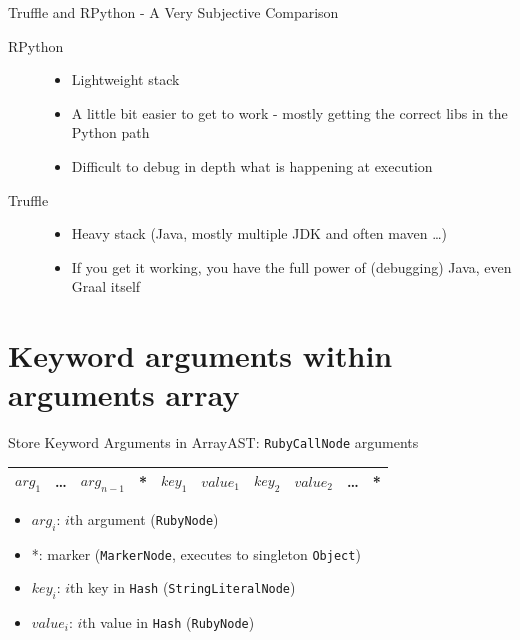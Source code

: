 \documentclass[xcolor=dvipsname,handout]{beamer} %
\begin{document}
\begin{frame}{Truffle and RPython - A Very Subjective Comparison}
\begin{description}
 \item[RPython] \begin{itemize}
  \item Lightweight stack
  \item A little bit easier to get to work - mostly getting the correct libs in the Python path
  \item Difficult to debug in depth what is happening at execution
\end{itemize}
\item[Truffle] \begin{itemize}
  \item Heavy stack (Java, mostly multiple JDK and often maven \dots)
  \item If you get it working, you have the full power of (debugging) Java, even Graal itself
\end{itemize}
\end{description}
\end{frame}


\appendix
\section{Keyword arguments within arguments array}

\begin{frame}{Store Keyword Arguments in Array}{AST: \lstinline{RubyCallNode} arguments}
\begin{table}
\begin{tabular}{|c|c|c|c|c|c|c|c|c|c|}
\hline
$\mathit{arg}_1$ & \ldots & $\mathit{arg}_{n-1}$ & * & $\mathit{key}_1$ & $\mathit{value}_1$ & $\mathit{key}_2$ & $\mathit{value}_2$ & \ldots & * \\
\hline
\end{tabular}
\end{table}
\begin{itemize}
    \item $\mathit{arg}_i$: $i$th argument (\lstinline{RubyNode})
    \item *: marker (\lstinline{MarkerNode}, executes to singleton \lstinline{Object})
    \item $\mathit{key}_i$: $i$th key in \lstinline{Hash} (\lstinline{StringLiteralNode})
    \item $\mathit{value}_i$: $i$th value in \lstinline{Hash} (\lstinline{RubyNode})
\end{itemize}
\end{frame}
\end{document}
